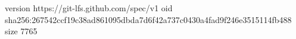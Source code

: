 version https://git-lfs.github.com/spec/v1
oid sha256:267542ccf19c38ad861095dbda7d6f42a737c0430a4fad9f246e3515114fb488
size 7765
